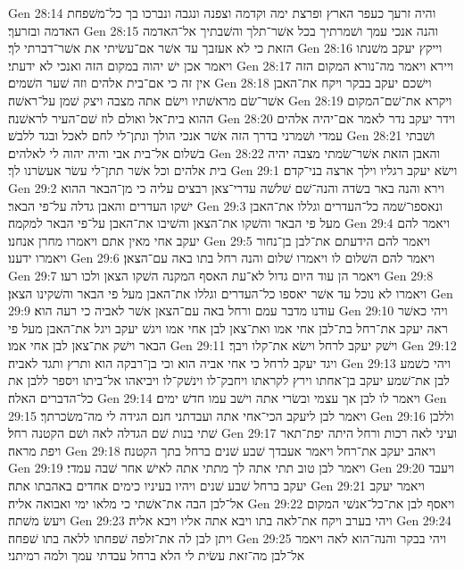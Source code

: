 Gen 28:14  והיה זרעך כעפר הארץ ופרצת ימה וקדמה וצפנה ונגבה ונברכו בך כל־משׁפחת האדמה ובזרעך׃
Gen 28:15  והנה אנכי עמך ושׁמרתיך בכל אשׁר־תלך והשׁבתיך אל־האדמה הזאת כי לא אעזבך עד אשׁר אם־עשׂיתי את אשׁר־דברתי לך׃
Gen 28:16  וייקץ יעקב משׁנתו ויאמר אכן ישׁ יהוה במקום הזה ואנכי לא ידעתי׃
Gen 28:17  ויירא ויאמר מה־נורא המקום הזה אין זה כי אם־בית אלהים וזה שׁער השׁמים׃
Gen 28:18  וישׁכם יעקב בבקר ויקח את־האבן אשׁר־שׂם מראשׁתיו וישׂם אתה מצבה ויצק שׁמן על־ראשׁה׃
Gen 28:19  ויקרא את־שׁם־המקום ההוא בית־אל ואולם לוז שׁם־העיר לראשׁנה׃
Gen 28:20  וידר יעקב נדר לאמר אם־יהיה אלהים עמדי ושׁמרני בדרך הזה אשׁר אנכי הולך ונתן־לי לחם לאכל ובגד ללבשׁ׃
Gen 28:21  ושׁבתי בשׁלום אל־בית אבי והיה יהוה לי לאלהים׃
Gen 28:22  והאבן הזאת אשׁר־שׂמתי מצבה יהיה בית אלהים וכל אשׁר תתן־לי עשׂר אעשׂרנו לך׃
Gen 29:1  וישׂא יעקב רגליו וילך ארצה בני־קדם׃
Gen 29:2  וירא והנה באר בשׂדה והנה־שׁם שׁלשׁה עדרי־צאן רבצים עליה כי מן־הבאר ההוא ישׁקו העדרים והאבן גדלה על־פי הבאר׃
Gen 29:3  ונאספו־שׁמה כל־העדרים וגללו את־האבן מעל פי הבאר והשׁקו את־הצאן והשׁיבו את־האבן על־פי הבאר למקמה׃
Gen 29:4  ויאמר להם יעקב אחי מאין אתם ויאמרו מחרן אנחנו׃
Gen 29:5  ויאמר להם הידעתם את־לבן בן־נחור ויאמרו ידענו׃
Gen 29:6  ויאמר להם השׁלום לו ויאמרו שׁלום והנה רחל בתו באה עם־הצאן׃
Gen 29:7  ויאמר הן עוד היום גדול לא־עת האסף המקנה השׁקו הצאן ולכו רעו׃
Gen 29:8  ויאמרו לא נוכל עד אשׁר יאספו כל־העדרים וגללו את־האבן מעל פי הבאר והשׁקינו הצאן׃
Gen 29:9  עודנו מדבר עמם ורחל באה עם־הצאן אשׁר לאביה כי רעה הוא׃
Gen 29:10  ויהי כאשׁר ראה יעקב את־רחל בת־לבן אחי אמו ואת־צאן לבן אחי אמו ויגשׁ יעקב ויגל את־האבן מעל פי הבאר וישׁק את־צאן לבן אחי אמו׃
Gen 29:11  וישׁק יעקב לרחל וישׂא את־קלו ויבך׃
Gen 29:12  ויגד יעקב לרחל כי אחי אביה הוא וכי בן־רבקה הוא ותרץ ותגד לאביה׃
Gen 29:13  ויהי כשׁמע לבן את־שׁמע יעקב בן־אחתו וירץ לקראתו ויחבק־לו וינשׁק־לו ויביאהו אל־ביתו ויספר ללבן את כל־הדברים האלה׃
Gen 29:14  ויאמר לו לבן אך עצמי ובשׂרי אתה וישׁב עמו חדשׁ ימים׃
Gen 29:15  ויאמר לבן ליעקב הכי־אחי אתה ועבדתני חנם הגידה לי מה־משׂכרתך׃
Gen 29:16  וללבן שׁתי בנות שׁם הגדלה לאה ושׁם הקטנה רחל׃
Gen 29:17  ועיני לאה רכות ורחל היתה יפת־תאר ויפת מראה׃
Gen 29:18  ויאהב יעקב את־רחל ויאמר אעבדך שׁבע שׁנים ברחל בתך הקטנה׃
Gen 29:19  ויאמר לבן טוב תתי אתה לך מתתי אתה לאישׁ אחר שׁבה עמדי׃
Gen 29:20  ויעבד יעקב ברחל שׁבע שׁנים ויהיו בעיניו כימים אחדים באהבתו אתה׃
Gen 29:21  ויאמר יעקב אל־לבן הבה את־אשׁתי כי מלאו ימי ואבואה אליה׃
Gen 29:22  ויאסף לבן את־כל־אנשׁי המקום ויעשׂ משׁתה׃
Gen 29:23  ויהי בערב ויקח את־לאה בתו ויבא אתה אליו ויבא אליה׃
Gen 29:24  ויתן לבן לה את־זלפה שׁפחתו ללאה בתו שׁפחה׃
Gen 29:25  ויהי בבקר והנה־הוא לאה ויאמר אל־לבן מה־זאת עשׂית לי הלא ברחל עבדתי עמך ולמה רמיתני׃
